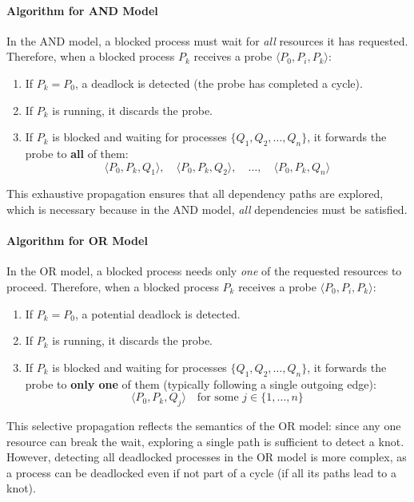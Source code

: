 \paragraph{Algorithm for AND Model}
In the AND model, a blocked process must wait for \textit{all} resources it has requested. Therefore, when a blocked process $P_k$ receives a probe $\langle P_0, P_i, P_k \rangle$:
\begin{enumerate}
   \item If $P_k = P_0$, a deadlock is detected (the probe has completed a cycle).
   \item If $P_k$ is running, it discards the probe.
   \item If $P_k$ is blocked and waiting for processes $\{Q_1, Q_2, \ldots, Q_n\}$, it forwards the probe to \textbf{all} of them:
   \[
   \langle P_0, P_k, Q_1 \rangle, \quad \langle P_0, P_k, Q_2 \rangle, \quad \ldots, \quad \langle P_0, P_k, Q_n \rangle
   \]
\end{enumerate}

This exhaustive propagation ensures that all dependency paths are explored, which is necessary because in the AND model, \textit{all} dependencies must be satisfied.

\paragraph{Algorithm for OR Model}
In the OR model, a blocked process needs only \textit{one} of the requested resources to proceed. Therefore, when a blocked process $P_k$ receives a probe $\langle P_0, P_i, P_k \rangle$:
\begin{enumerate}
   \item If $P_k = P_0$, a potential deadlock is detected.
   \item If $P_k$ is running, it discards the probe.
   \item If $P_k$ is blocked and waiting for processes $\{Q_1, Q_2, \ldots, Q_n\}$, it forwards the probe to \textbf{only one} of them (typically following a single outgoing edge):
   \[
   \langle P_0, P_k, Q_j \rangle \quad \text{for some } j \in \{1, \ldots, n\}
   \]
\end{enumerate}

This selective propagation reflects the semantics of the OR model: since any one resource can break the wait, exploring a single path is sufficient to detect a knot. However, detecting all deadlocked processes in the OR model is more complex, as a process can be deadlocked even if not part of a cycle (if all its paths lead to a knot).

